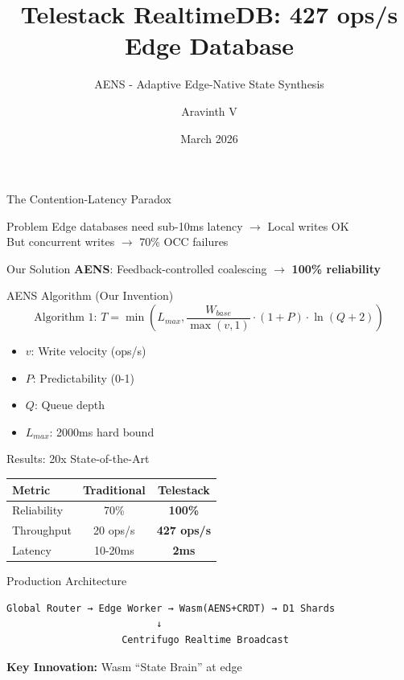 \documentclass{beamer}
\title{Telestack RealtimeDB: 427 ops/s Edge Database}
\subtitle{AENS - Adaptive Edge-Native State Synthesis}
\author{Aravinth V}
\institute{Telestack}
\date{March 2026}
\begin{document}
\begin{frame}
\titlepage
\end{frame}

\begin{frame}{The Contention-Latency Paradox}
\begin{block}{Problem}
Edge databases need sub-10ms latency $\rightarrow$ Local writes OK\\
But concurrent writes $\rightarrow$ 70\% OCC failures
\end{block}
\begin{alertblock}{Our Solution}
\textbf{AENS}: Feedback-controlled coalescing $\rightarrow$ \textbf{100\% reliability}
\end{alertblock}
\end{frame}

\begin{frame}{AENS Algorithm (Our Invention)}
$$\text{Algorithm 1: } T = \min\left( L_{max}, \frac{W_{base}}{\max(v, 1)} \cdot (1 + P) \cdot \ln(Q + 2) \right)$$
\begin{itemize}
\item $v$: Write velocity (ops/s)
\item $P$: Predictability (0-1)
\item $Q$: Queue depth
\item $L_{max}$: 2000ms hard bound
\end{itemize}
\end{frame}

\begin{frame}{Results: 20x State-of-the-Art}
\begin{table}
\begin{tabular}{lcc}
\toprule
Metric & Traditional & \textbf{Telestack} \\
\midrule
Reliability & 70\% & \textbf{100\%} \\
Throughput & 20 ops/s & \textbf{427 ops/s} \\
Latency & 10-20ms & \textbf{2ms} \\
\bottomrule
\end{tabular}
\end{table}
\end{frame}

\begin{frame}{Production Architecture}
\begin{verbatim}
Global Router → Edge Worker → Wasm(AENS+CRDT) → D1 Shards
                          ↓
                    Centrifugo Realtime Broadcast
\end{verbatim}
\textbf{Key Innovation:} Wasm ``State Brain'' at edge
\end{frame}
\end{document}
